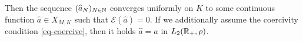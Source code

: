 \begin{theorem}
	Then the sequence $(\widehat a_{N})_{N \in \mathbb{N}}$ converges uniformly on $K$ to some continuous function $\widehat a \in X_{M,K}$ such that
	$\mathcal E(\widehat a)=0$. If we additionally assume the coercivity condition \eqref{eq-coercive}, then it holds
	$\widehat a=a$ in $L_2(\mathbb{R}_+,\rho)$.
%	
%	
\end{theorem}

